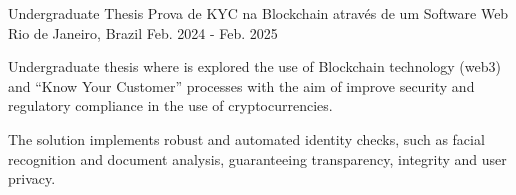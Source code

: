 

\begin{cventries}

  \cventry
    {Undergraduate Thesis} %
    {Prova de KYC na Blockchain através de um Software Web} %
    {Rio de Janeiro, Brazil} %
    {Feb. 2024 - Feb. 2025} %
    {
      \begin{cvitems} %
        \item {Undergraduate thesis where is explored the use of Blockchain technology (web3) and “Know Your Customer” processes with the aim of improve security and regulatory compliance in the use of cryptocurrencies.}
        \item {The solution implements robust and automated identity checks, such as facial recognition and document analysis, guaranteeing transparency, integrity and user privacy.}
      \end{cvitems}
    }

\end{cventries}
